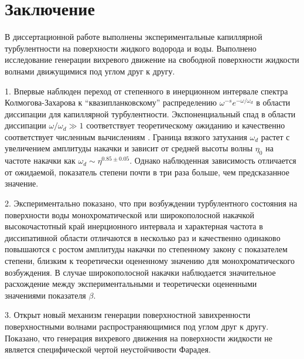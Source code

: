 \chapter*{Заключение}						%

В диссертационной работе выполнены экспериментальные капиллярной турбулентности на поверхности жидкого водорода и воды. Выполнено исследование генерации вихревого движение на свободной поверхности жидкости волнами движущимися под углом друг к другу.

1. Впервые наблюден переход от степенного в инерционном интервале спектра Колмогова-Захарова к “квазипланковскому” распределению $\omega^{-s}e^{-\omega/\omega_d}$ в области диссипации для капиллярной турбулентности. Экспоненциальный спад в области диссипации $\omega/\omega_d \gg 1$ соответствует теоретическому ожиданию и качественно соответствует численным вычислениям \cite{Ryzhenkova1990}. Граница вязкого затухания $\omega_d$ растет с увеличением амплитуды накачки и зависит от средней высоты волны $\eta_0$ на частоте накачки как $\omega_d \sim \eta^{0.85 \pm 0.05}$. Однако наблюденная зависимость отличается от ожидаемой, показатель степени почти в три раза больше, чем предсказанное значение.

2. Экспериментально показано, что при возбуждении турбулентного состояния на поверхности воды монохроматической или широкополосной накачкой высокочастотный край инерционного интервала и характерная частота в диссипативной области отличаются в несколько раз и качественно одинаково повышаются с ростом амплитуды накачки по степенному закону с показателем степени, близким к теоретически оцененному значению для монохроматического возбуждения. В случае широкополосной накачки наблюдается значительное расхождение между экспериментальными и теоретически оцененными значениями показателя $\beta$.

3. Открыт новый механизм генерации поверхностной завихренности поверхностными волнами распространяющимися под углом друг к другу. Показано, что генерация вихревого движения на поверхности жидкости не является специфической чертой неустойчивости Фарадея.

